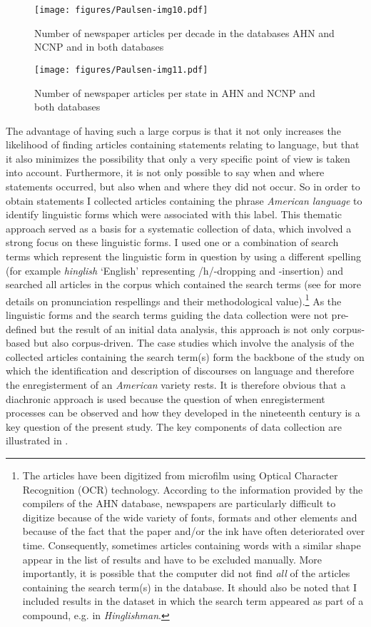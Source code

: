 \begin{figure}
\texttt{[image: figures/Paulsen-img10.pdf]}
\caption{
Number of newspaper articles per decade in the databases AHN and NCNP and in both databases
}
\label{fig:key:10}
\end{figure}


\begin{figure}
\texttt{[image: figures/Paulsen-img11.pdf]}
\caption{
Number of newspaper articles per state in AHN and NCNP and both databases
}
\label{fig:key:11}
\end{figure}

The advantage of having such a large corpus is that it not only increases the likelihood of finding articles containing statements relating to language, but that it also minimizes the possibility that only a very specific point of view is taken into account. Furthermore, it is not only possible to say when and where statements occurred, but also when and where they did not occur. So in order to obtain statements I collected articles containing the phrase \emph{American language} to identify linguistic forms which were associated with this label. This thematic approach served as a basis for a systematic collection of data, which involved a strong focus on these linguistic forms. I used one or a combination of search terms which represent the linguistic form in question by using a different spelling (for example \emph{hinglish} ‘English’ representing /h/-dropping and -insertion) and searched all articles in the corpus which contained the search terms (see  for more details on pronunciation respellings and their methodological value).\footnote{The articles have been digitized from microfilm using Optical Character Recognition (OCR) technology. According to the information provided by the compilers of the AHN database, newspapers are particularly difficult to digitize because of the wide variety of fonts, formats and other elements and because of the fact that the paper and/or the ink have often deteriorated over time. Consequently, sometimes articles containing words with a similar shape appear in the list of results and have to be excluded manually. More importantly, it is possible that the computer did not find \textit{all} of the articles containing the search term(s) in the database. It should also be noted that I included results in the dataset in which the search term appeared as part of a compound, e.g. in \textit{Hinglishman}.} As the linguistic forms and the search terms guiding the data collection were not pre-defined but the result of an initial data analysis, this approach is not only corpus-based but also corpus-driven. The case studies which involve the analysis of the collected articles containing the search term(s) form the backbone of the study on which the identification and description of discourses on language and therefore the enregisterment of an \textit{American} variety rests. It is therefore obvious that a diachronic approach is used because the question of when enregisterment processes can be observed and how they developed in the nineteenth century is a key question of the present study. The key components of data collection are illustrated in .

